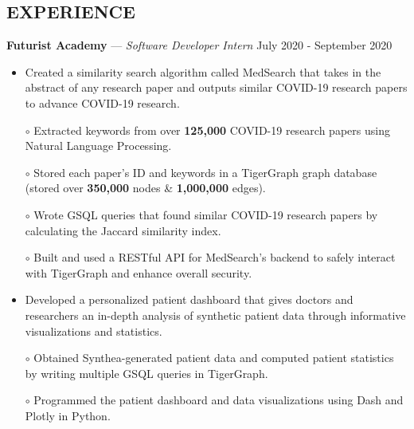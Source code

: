 \documentclass[11pt]{res}
\begin{document}
\begin{footnotesize}
\begin{resume}
\begin{small}
\section{EXPERIENCE}
\end{small}
\vspace{.5mm}
\textbf{Futurist Academy} — {\sl Software Developer Intern} \hfill July 2020 - September 2020\vspace{-5mm}
\begin{itemize}[leftmargin=6.25mm]
\item Created a similarity search algorithm called MedSearch that takes in the abstract of any research paper and outputs similar COVID-19 research papers to advance COVID-19 research.
\end{itemize}
\vspace{-6.4mm}
\begin{itemize} \itemsep -2pt 
\item[$\circ$] Extracted keywords from over \textbf{125,000} COVID-19 research papers using Natural Language Processing.
\vspace{1mm}
\item[$\circ$] Stored each paper's ID and keywords in a TigerGraph graph database (stored over \textbf{350,000} nodes \& \textbf{1,000,000} edges).
\vspace{1mm}
\item[$\circ$] Wrote GSQL queries that found similar COVID-19 research papers by calculating the Jaccard similarity index.
\vspace{1mm}
\item[$\circ$] Built and used a RESTful API for MedSearch's backend to safely interact with TigerGraph and enhance overall security.
\end{itemize}
\vspace{-6mm}
\begin{itemize}[leftmargin=6.25mm]
\item Developed a personalized patient dashboard that gives doctors and researchers an in-depth analysis of synthetic patient data through informative visualizations and statistics.
\end{itemize}
\vspace{-6.95mm}
\begin{itemize} \itemsep -2pt 
\item[$\circ$] Obtained Synthea-generated patient data and computed patient statistics by writing multiple GSQL queries in TigerGraph.
\vspace{1mm}
\item[$\circ$] Programmed the patient dashboard and data visualizations using Dash and Plotly in Python.

\end{itemize}
\end{resume}
\end{footnotesize}
\end{document}
